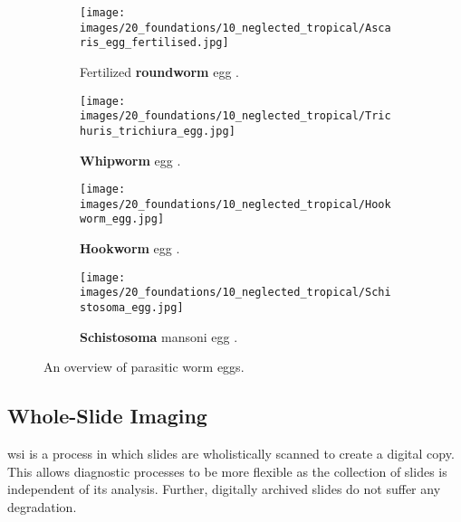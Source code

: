 \begin{figure}[tb]
    \centering
    \begin{subfigure}[t]{0.4\textwidth}
        \centering
        \texttt{[image: images/20\_foundations/10\_neglected\_tropical/Ascaris\_egg\_fertilised.jpg]}
        \caption{Fertilized \textbf{roundworm} egg \cite{dpdx2019ascariasis}.}
        \label{fig:Foundations:NCLs:Diagnosis:Ascaris:Egg}
        \vspace*{2mm}
    \end{subfigure}
    \hspace*{1em}
    \begin{subfigure}[t]{0.4\textwidth}
        \centering
        \texttt{[image: images/20\_foundations/10\_neglected\_tropical/Trichuris\_trichiura\_egg.jpg]}
        \caption{\textbf{Whipworm} egg \cite{dpdx2017trichuriasis}.}
        \label{fig:Foundations:NCLs:Diagnosis:Whipworm:Egg}
        \vspace*{2mm}
    \end{subfigure}

    \begin{subfigure}[t]{0.4\textwidth}
        \centering
        \texttt{[image: images/20\_foundations/10\_neglected\_tropical/Hookworm\_egg.jpg]}
        \caption{\textbf{Hookworm} egg \cite{dpdx2019hookworm}.}
        \label{fig:Foundations:NCLs:Diagnosis:Hookworm:Egg}
    \end{subfigure}
    \hspace*{1em}
    \begin{subfigure}[t]{0.4\textwidth}
        \centering
        \texttt{[image: images/20\_foundations/10\_neglected\_tropical/Schistosoma\_egg.jpg]}
        \caption{\textbf{Schistosoma} mansoni egg \cite{dpdx2019schistosomiasis}.}
        \label{fig:Foundations:NCLs:Diagnosis:Schistosoma:Egg}
    \end{subfigure}
    \caption{An overview of parasitic worm eggs.}
    \label{fig:Foundations:NCLs:Diagnosis:Overview}
\end{figure}

\subsection{Whole-Slide Imaging}
\label{sec:Foundations:NTDs:WHoleSlideImaging}

\Ac{wsi} \cite{ghaznavi2013digital, hanna2019whole, el-gabry2014wholeslide} is a process in which slides are wholistically scanned to create a digital copy. This allows diagnostic processes to be more flexible as the collection of slides is independent of its analysis. Further, digitally archived slides do not suffer any degradation. 

